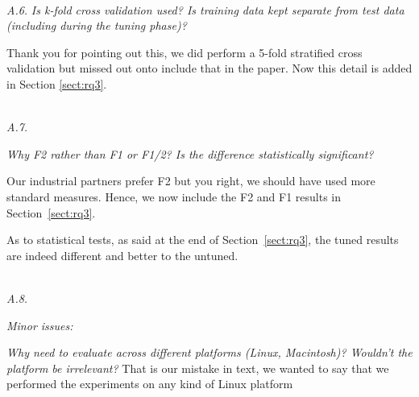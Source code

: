 \documentclass[twocolumn,5p,sort&compress]{elsarticle}
\newcommand{\tion}[1]{\ref{sect:#1}}
\theoremstyle{break}
\begin{document}
\noindent
\textit{\\A.6.} 
\textit{Is k-fold cross validation used?  Is training data kept separate from test data (including during the tuning phase)? \\}

Thank you for pointing out this, we did perform a 5-fold stratified cross validation but missed out onto include that in the paper. Now this detail is added in Section \ref{sect:rq3}.  %


\noindent
\textit{\\A.7.}  

\textit{Why F2 rather than F1 or F1/2? Is the difference statistically significant? \\}

Our industrial partners prefer F2 but you right, we should have used more standard measures. Hence, we now
include the F2 and F1 results in Section~\tion{rq3}. 

As to statistical tests, as said at the end of Section~\tion{rq3}, the tuned results are indeed different and better to the untuned. 



\noindent
\textit{\\A.8.}  

\textit{Minor issues:}
 
{\em Why need to evaluate across different platforms (Linux, Macintosh)? Wouldn't the platform be irrelevant?}
That is our mistake in text, we wanted to say that we performed the experiments on any kind of Linux platform
\end{document}
